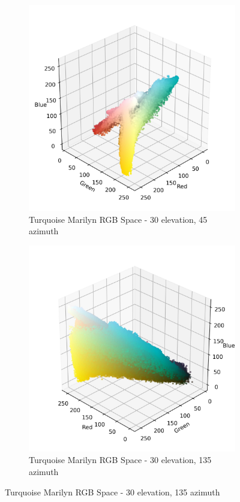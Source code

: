 \documentclass{article}
\begin{document}
\begin{figure}[ht]
  \centering
  \begin{subfigure}{0.45\textwidth}
    \includegraphics[width=\textwidth]{main_files/figure-latex/4_9_turq_marilyn_original_scatter.jpg}
    \caption{Turquoise Marilyn RGB Space - 30 \degree elevation, 45 \degree azimuth}
    \label{fig:4_9_turq_marilyn_original_scatter}
  \end{subfigure}
  \hfill
  \begin{subfigure}{0.45\textwidth}
    \includegraphics[width=\textwidth]{main_files/figure-latex/4_10_turq_marilyn_original_scatter.jpg}
    \caption{Turquoise Marilyn RGB Space - 30 \degree elevation, 135 \degree azimuth}
    \label{fig:4_10_turq_marilyn_original_scatter}
  \end{subfigure}
  \label{fig:turq_marilyn_original_scatter_1}
\end{figure}
\end{document}
